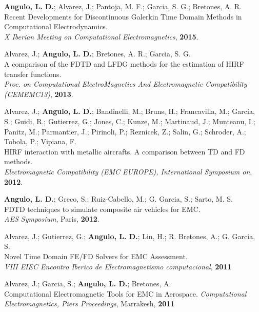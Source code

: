 \documentclass[a4paper,margin,line]{res}
\begin{document}
\begin{resume}
\begin{minipage}{\textwidth}
{\bf Angulo, L. D.}; Alvarez, J.; Pantoja, M. F.; Garcia, S. G.; Bretones, A. R.\\
Recent Developments for Discontinuous {Galerkin} Time Domain Methods in Computational Electrodynamics.\\
{\it X Iberian Meeting on Computational Electromagnetics}, {\bf 2015}.
\end{minipage}

Alvarez, J.; {\bf Angulo, L. D.}; Bretones, A. R.; Garcia, S. G.\\
A comparison of the FDTD and LFDG methods for the estimation of HIRF transfer functions.\\
{\it Proc. on Computational ElectroMagnetics And Electromagnetic Compatibility (CEMEMC13)}, {\bf 2013}.

Alvarez, J.; {\bf Angulo, L. D.}; Bandinelli, M.; Bruns, H.; Francavilla, M.; Garcia, S.; Guidi, R.; Gutierrez, G.; Jones, C.; Kunze, M.; Martinaud, J.; Munteanu, I.; Panitz, M.; Parmantier, J.; Pirinoli, P.; Reznicek, Z.; Salin, G.; Schroder, A.; Tobola, P.; Vipiana, F.\\
HIRF interaction with metallic aircrafts. A comparison between TD and FD methods.\\
{\it Electromagnetic Compatibility (EMC EUROPE), International Symposium on}, {\bf 2012}.

{\bf Angulo, L. D.}; Greco, S.; Ruiz-Cabello, M.; G. Garcia, S.; Sarto, M. S.\\
FDTD techniques to simulate composite air vehicles for EMC.\\
{\it AES Symposium}, Paris, {\bf 2012}.

\begin{minipage}{\textwidth}
Alvarez, J.; Gutierrez, G.;  {\bf Angulo, L. D.}; Lin, H.; R. Bretones, A.; G. Garcia, S.\\
Novel Time Domain FE/FD Solvers for EMC Assessment.\\
{\it VIII EIEC Encontro Iberico de Electromagnetismo computacional}, {\bf 2011}
\end{minipage}

\begin{minipage}{\textwidth}
Alvarez, J.; Garcia, S.;  {\bf Angulo, L. D.}; Bretones, A.\\
Computational Electromagnetic Tools for EMC in Aerospace. 
{\it Computational Electromagnetics, Piers Proceedings}, Marrakesh, {\bf 2011}
\end{minipage}


\end{resume}
\end{document}
